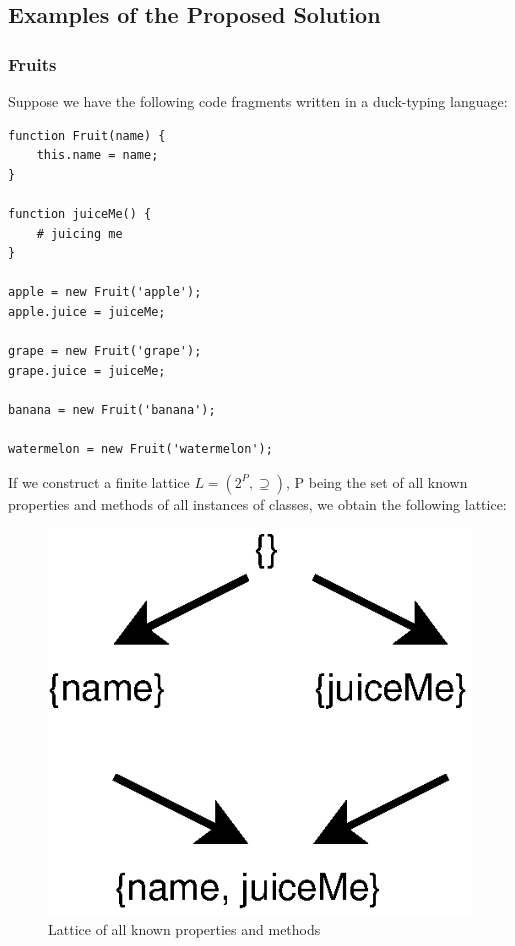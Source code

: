 \documentclass[a4paper,12pt]{article}
\begin{document}
\subsection{Examples of the Proposed Solution}
\subsubsection{Fruits}
Suppose we have the following code fragments written in a duck-typing language:\\
\begin{lstlisting}[caption=Example: Fruits]
function Fruit(name) {
	this.name = name;
}

function juiceMe() {
	# juicing me
}

apple = new Fruit('apple');
apple.juice = juiceMe;

grape = new Fruit('grape');
grape.juice = juiceMe;

banana = new Fruit('banana');

watermelon = new Fruit('watermelon');
\end{lstlisting}
If we construct a finite lattice $L = (2^P, \supseteq)$, P being the set of all known properties and methods of all instances of classes, we obtain the following lattice:\\
\begin{figure}[H]
	\includegraphics{lattice1.eps}
	\centering
	\caption{Lattice of all known properties and methods}
\end{figure}
\end{document}
